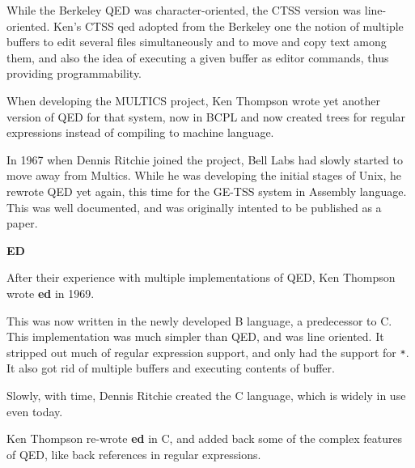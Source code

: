 While the Berkeley QED was character-oriented, the CTSS version was line-oriented. Ken's CTSS qed adopted from the Berkeley one the notion of multiple buffers to edit several files simultaneously and to move and copy text among them, and also the idea of executing a given buffer as editor commands, thus providing programmability.

When developing the MULTICS project, Ken Thompson wrote yet another version of QED for that system, now in BCPL
and now created trees for regular expressions instead of compiling to machine language.

In 1967 when Dennis Ritchie joined the project, Bell Labs had slowly started to move away from Multics. While he was developing the initial stages of Unix, he rewrote QED yet again, this time for the GE-TSS system in Assembly language.
This was well documented, and was originally intented to be published as a paper.


\textbf{ED}

After their experience with multiple implementations of QED,
Ken Thompson wrote \textbf{ed} in 1969.

This was now written in the newly developed B language, a predecessor to C.
This implementation was much simpler than QED, and was line oriented.
It stripped out much of regular expression support, and only had the support
for \lstinline|*|.
It also got rid of multiple buffers and executing contents of buffer.

Slowly, with time, Dennis Ritchie created the C language, which is widely in use
even today.

Ken Thompson re-wrote \textbf{ed} in C, and added back some of the
complex features of QED, like back references in regular expressions.

